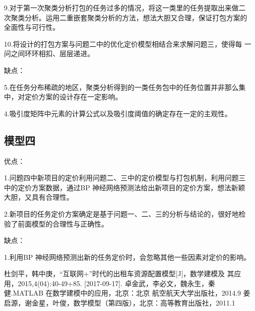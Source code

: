 \documentclass[withoutpreface,bwprint]{cumcmthesis} %
\begin{document}
9.对于第一次聚类分析打包的任务过多的情况，将这一类里的任务提取出来做二
次聚类分析。运用二重嵌套聚类分析的方法，想法大胆又合理，保证打包方案的
全面性与可行性。

10.将设计的打包方案与问题二中的优化定价模型相结合来求解问题三，使得每
一问之间环环相扣、层层递进。

缺点：

5.在任务分布稀疏的地区，聚类分析得到的一类任务包中的任务位置并非那么集
中，对定价方案的设计存在一定影响。

4.吸引度矩阵中元素的计算公式以及吸引度阈值的确定存在一定的主观性。

\subsection{模型四}

优点：

1.问题四中新项目的定价利用问题二、三中的定价模型与打包机制，利用问题三
中的定价方案数据，通过BP 神经网络预测法给出新项目的定价方案，想法新颖
大胆，又具有合理性。

2.新项目的任务定价方案确定是基于问题一、二、三的分析与结论的，很好地检
验了前面模型的合理性与正确性。

缺点：

1.利用BP 神经网络预测出新的任务定价时，会忽略其他一些因素对定价的影响。

\begin{thebibliography}{9}%
杜剑平，韩中庚，“互联网+”时代的出租车资源配置模型[J]，数学建模及
    其应用，2015,4(04):40-49+85. [2017-09-17].
    卓金武，李必文，魏永生，秦健.MATLAB 在数学建模中的应用，北京：北京
    航空航天大学出版社，2014.9
    姜启源，谢金星，叶俊，数学模型（第四版），北京：高等教育出版社，2011.1
\end{thebibliography}

\begin{appendices}
\end{appendices}
\end{document}
